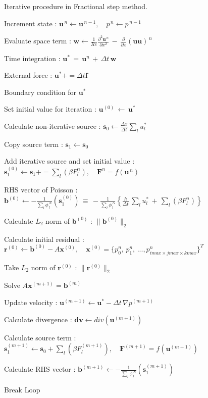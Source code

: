 \begin{algorithm}
\caption{Iterative procedure in Fractional step method.}
\label{algo:FS}
\begin{algorithmic}

\State Increment state : $\bm{u}^{\,n} \gets  \bm{u}^{\,n-1}, \quad p^{\,n} \gets  p^{\,n-1}$

\State Evaluate space term : $\displaystyle{ \bm{w} \gets \frac{1}{Re} \frac{\partial^2 \bm{u}^{\,n}}{\partial x^2} \,-\, \frac{\partial}{\partial x} (\bm{u} \bm{u})^{\,n} }$

\State Time integration : $\bm{u}^* \,=\, \bm{u}^n \,+\, \Delta t \, \bm{w}$

\State External force : $\bm{u}^* += \Delta t \bm{f}$

\State Boundary condition for $\bm{u}^*$

\State Set initial value for iteration : $\bm{u}^{(0)} \,\gets \, \bm{u}^*$

\State Calculate non-iterative source : $ \displaystyle{ \bm{s}_0 \gets \frac{\Delta x}{\Delta t} \sum \limits_l u^*_l }$

\State Copy source term : $\bm{s}_1 \gets \bm{s}_0$

\State Add iterative source and set initial value : $\bm{s}_1^{(0)} \gets \bm{s}_1 += \sum \limits_l (\beta F^n_l), \quad \bm{F}^n = f(\bm{u}^{\,n})$

\State RHS vector of Poisson : $ \displaystyle{ \bm{b}^{(0)} \gets - \frac{1}{\sum \limits_l \phi^{\,N}_{\,l}} \left( \bm{s}_1^{(0)} \right) \,\equiv\,
- \frac{1}{\sum \limits_l \phi^{\,N}_{\,l}} 
\left\{ \frac{h}{\Delta t} \,\sum \limits_l u^*_l \,+\, \sum \limits_l (\beta F^n_l) \right\} }$

\State Calculate $L_2$ norm of $\bm{b}^{(0)}$ : $\| \bm{b}^{(0)} \|_2$

\State Calculate initial residual : $ \bm{r}^{(0)} \gets \bm{b}^{(0)} -A \bm{x}^{(0)}, \quad \bm{x}^{(0)} = \{p^n_0,\,p^n_1,\,...,p^n_{imax \times jmax \times kmax}\}^T$

\State Take $L_2$ norm of $\bm{r}^{(0)}$ : $\| \bm{r}^{(0)} \|_2$


\State Solve $A \bm{x}^{(m+1)} = \bm{b}^{(m)}$

\State Update velocity : $\bm{u}^{(m+1)} \gets \bm{u}^* - \Delta t \,\nabla p^{(m+1)}$

\State Calculate divergence : $\bm{dv} \gets div(\bm{u}^{(m+1)})$

\State Calculate source term : $\bm{s}_1^{(m+1)} \gets \bm{s}_0 + \sum \limits_l \left(\beta F^{(m+1)}_l \right), \quad \bm{F}^{(m+1)} = f(\bm{u}^{(m+1)})$

\State Calculate RHS vector : $ \displaystyle{ \bm{b}^{(m+1)} \gets - \frac{1}{\sum \limits_l \phi^{\,N}_{\,l}} \left( \bm{s}_1^{(m+1)} \right)}$

\State Break Loop
\EndIf

\EndFor

\end{algorithmic}
\end{algorithm}




